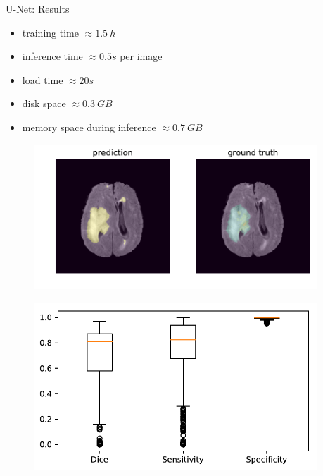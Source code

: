 \documentclass[final]{beamer}
\newlength{\onecolwid}
\newlength{\twocolwid}
\begin{document}
\begin{frame}[t]
\begin{columns}[t]
\begin{column}{\twocolwid}
\begin{columns}[t,totalwidth=\twocolwid]
\begin{column}{\onecolwid}
\end{column} %

\begin{column}{\onecolwid} %


\begin{block}{U-Net: Results}
\begin{itemize}[label={}]
\item training time $\approx \SI{1.5}{h}$
\item inference time $\approx \si{0.5}{s}$ per image
\item load time $\approx \si{20}{s}$
\item disk space $\approx \SI{0.3}{GB}$
\item memory space during inference $\approx \SI{0.7}{GB}$
\end{itemize}
\begin{figure}
\includegraphics[width=0.7\linewidth]{test_Flair_84}
\end{figure}

\begin{figure}
\includegraphics[width=0.68\linewidth]{boxplots}
\end{figure}
\end{block}



\end{column}
\end{columns}
\end{column}
\end{columns}
\end{frame}
\end{document}

